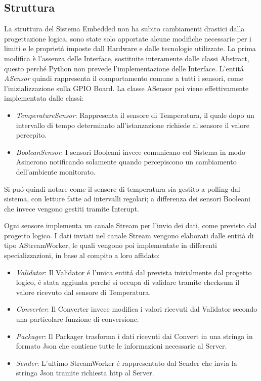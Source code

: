 \subsection{Struttura}
La struttura del Sistema Embedded non ha subito cambiamenti drastici dalla progettazione logica, sono state solo apportate alcune modifiche necessarie per i limiti e le propriet\'a imposte dall Hardware e dalle tecnologie utilizzate.
La prima modifica è l'assenza delle Interface, sostituite interamente dalle classi Abstract, questo perch\'e Python non prevede l'implementazione delle Interface.
L'entit\'a \textit{ASensor} quindi rappresenta il comportamento comune a tutti i sensori, come l'inizializzazione sulla GPIO Board.
La classe ASensor poi viene effettivamente implementata dalle classi:
\begin{itemize}
\item \textit{TemperatureSensor}: Rappresenta il sensore di Temperatura, il quale dopo un intervallo di tempo determinato all'istanzazione richiede al sensore il valore percepito.
\item \textit{BooleanSensor}: I sensori Booleani invece comunicano col Sistema in modo Asincrono notificando solamente quando percepiscono un cambiamento dell'ambiente monitorato.
\end{itemize}

Si pu\'o quindi notare come il sensore di temperatura sia gestito a polling dal sistema, con letture fatte ad intervalli regolari; a differenza dei sensori Booleani che invece vengono gestiti tramite Interupt.

Ogni sensore implementa un canale Stream per l'invio dei dati, come previsto dal progetto logico.
I dati inviati nel canale Stream vengono elaborati dalle entità di tipo AStreamWorker, le quali vengono poi implementate in differenti specializzazioni, in base al compito a loro affidato:
\begin{itemize}
\item \textit{Validator}: Il Validator \'e l'unica entit\'a dal prevista inizialmente dal progetto logico, \'e stata aggiunta perch\'e si occupa di validare tramite checksum il valore ricevuto dal sensore di Temperatura.
\item \textit{Converter}: Il Converter invece modifica i valori ricevuti dal Validator secondo una particolare funzione di conversione.
\item \textit{Packager}: Il Packager trasforma i dati ricevuti dai Convert in una stringa in formato Json che contiene tutte le informazioni necessarie al Server.
\item \textit{Sender}: L'ultimo StreamWorker \'e rappresentato dal Sender che invia la stringa Json tramite richiesta http al Server.
\end{itemize}

